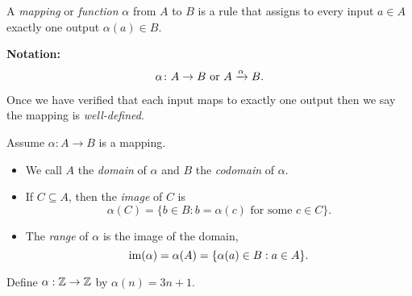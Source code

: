 \documentclass[12pt]{article}
\begin{document}
 
	\startdoc
	\begin{defn}
		A \emph{mapping} or \emph{function} $\alpha$ from $A$ to $B$ is a rule that assigns to every input $a\in A$ exactly one output $\alpha(a)\in B$.  
		
		\textbf{Notation:}
		\[\alpha\colon A\to B\textup{ or }A\xrightarrow{\alpha}B.\]
		
		Once we have verified that each input maps to exactly one output then we say the mapping is \emph{well-defined}.
	\end{defn}


{
	\begin{defn} Assume $\alpha:A \to B$ is a mapping.
		\begin{itemize}[label=--]
			\item We call $A$ the \emph{domain} of $\alpha$ and $B$ the \emph{codomain} of $\alpha$.
			\item If $C\subseteq A$, then the \emph{image} of $C$ is \[\alpha(C)=\{b\in B : b=\alpha(c)\text{ for some } c\in C\}.\] 
			\item The \emph{range} of $\alpha$ is the image of the domain, \[\operatorname{im}(\alpha)=\alpha(A)=\{\alpha(a)\in B : a\in A\}.\]
		\end{itemize}
	\end{defn}
}
{
	\begin{exercise}
		Define $\alpha:\mathbb{Z}\to\mathbb{Z}$ by $\alpha(n)=3n+1$. 
	\end{exercise}
}
\end{document}
